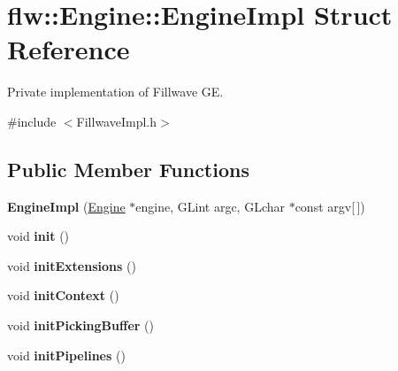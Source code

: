 \hypertarget{structflw_1_1Engine_1_1EngineImpl}{}\section{flw\+:\+:Engine\+:\+:Engine\+Impl Struct Reference}
\label{structflw_1_1Engine_1_1EngineImpl}


Private implementation of Fillwave GE.  




{\ttfamily \#include $<$Fillwave\+Impl.\+h$>$}

\subsection*{Public Member Functions}
\begin{DoxyCompactItemize}
\item 
{\bfseries Engine\+Impl} (\hyperlink{classflw_1_1Engine}{Engine} $\ast$engine, G\+Lint argc, G\+Lchar $\ast$const argv\mbox{[}$\,$\mbox{]})\hypertarget{structflw_1_1Engine_1_1EngineImpl_a2858409f491cbadb238bab1935eb086b}{}\label{structflw_1_1Engine_1_1EngineImpl_a2858409f491cbadb238bab1935eb086b}

\item 
void {\bfseries init} ()\hypertarget{structflw_1_1Engine_1_1EngineImpl_a7d4855ffc0f8745ee633b785632b74d8}{}\label{structflw_1_1Engine_1_1EngineImpl_a7d4855ffc0f8745ee633b785632b74d8}

\item 
void {\bfseries init\+Extensions} ()\hypertarget{structflw_1_1Engine_1_1EngineImpl_aaeb903aff35a54f53f87a15bb3b4e25f}{}\label{structflw_1_1Engine_1_1EngineImpl_aaeb903aff35a54f53f87a15bb3b4e25f}

\item 
void {\bfseries init\+Context} ()\hypertarget{structflw_1_1Engine_1_1EngineImpl_a58da927e421b984014838bc1a6884532}{}\label{structflw_1_1Engine_1_1EngineImpl_a58da927e421b984014838bc1a6884532}

\item 
void {\bfseries init\+Picking\+Buffer} ()\hypertarget{structflw_1_1Engine_1_1EngineImpl_a8578f4bb773044ef9f96a69aeb3a882f}{}\label{structflw_1_1Engine_1_1EngineImpl_a8578f4bb773044ef9f96a69aeb3a882f}

\item 
void {\bfseries init\+Pipelines} ()\hypertarget{structflw_1_1Engine_1_1EngineImpl_abab987d1ab4675fd97512e8f590dc757}{}\label{structflw_1_1Engine_1_1EngineImpl_abab987d1ab4675fd97512e8f590dc757}


\end{DoxyCompactItemize}
